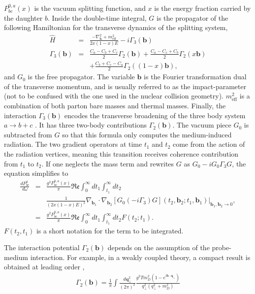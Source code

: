 $P^{0,a}_{bc}(x)$ is the vacuum splitting function, and $x$ is the energy fraction carried by the daughter $b$.
Inside the double-time integral, $G$ is the propagator of the following Hamiltonian for the transverse dynamics of the splitting system,
\begin{eqnarray}
\hat{H} &=& \frac{-\nabla^2_{\mathbf{b}} + m^2_\textrm{eff}}{2x(1-x)E} - i \Gamma_3(\mathbf{b})\\
\Gamma_3(\mathbf{b}) &=& \frac{C_a-C_b+C_c}{2}\Gamma_2(\mathbf{b}) + \frac{C_a-C_c+C_b}{2}\Gamma_2(x\mathbf{b}) \\\nonumber
&&+ \frac{C_b+C_c-C_a}{2}\Gamma_2((1-x)\mathbf{b}),
\end{eqnarray}
and $G_0$ is the free propagator. 
The variable $\mathbf{b}$ is the Fourier transformation dual of the transverse momentum, and is usually referred to as the impact-parameter (not to be confused with the one used in the nuclear collision geometry).
$m^2_\textrm{eff}$ is a combination of both parton bare masses and thermal masses.
Finally, the interaction $\Gamma_3(\mathbf{b})$ encodes the transverse broadening of the three body system $a\rightarrow b+c$ \cite{Zakharov:1997uu}.
It has three two-body contributions $\Gamma_2(\mathbf{b})$.
The vacuum piece $G_0$ is subtracted from $G$ so that this formula only computes the medium-induced radiation.
The two gradient operators at time $t_1$ and $t_2$ come from the action of the radiation vertices, meaning this transition receives coherence contribution from $t_1$ to $t_2$.
If one neglects the mass term and rewrites $G$ as $G_0 -i G_0\Gamma_3 G$, the equation simplifies to 
\begin{eqnarray}
\nonumber
\frac{dP^{a}_{bc}}{d\omega} &=& \frac{g^2 P^{0,a}_{bc}(x)}{\pi}\mathfrak{Re}\int_0^\infty dt_1 \int_{t_1}^{\infty} dt_2\\ &&\frac{1}{(2x(1-x) E)^2}\nabla_{\mathbf{b}_1} \cdot\nabla_{\mathbf{b}_2} [G_0(-i\Gamma_3) G](t_2, \mathbf{b}_2;t_1, \mathbf{b}_1)|_{\mathbf{b}_1, \mathbf{b}_2 \rightarrow 0},\\
&=& \frac{g^2 P^{0,a}_{bc}(x)}{\pi}\mathfrak{Re}\int_0^\infty dt_1 \int_{t_1}^{\infty} dt_2 F(t_2; t_1).
\label{eq:theory-dR-2}
\end{eqnarray}
$F(t_2, t_1)$ is a short notation for the term to be integrated.

The interaction potential $\Gamma_2(\mathbf{b})$ depends on the assumption of the probe-medium interaction.
For example, in a weakly coupled theory, a compact result is obtained at leading order \cite{Aurenche:2002pd},
\begin{eqnarray}
\Gamma_2(\mathbf{b}) = \frac{1}{\pi}\int \frac{d\mathbf{q}_\perp^2}{(2\pi)^2} \frac{g^2 T m_D^2 (1-e^{i\mathbf{b}\cdot\mathbf{q_\perp}})}{q_\perp^2(q_\perp^2+m_D^2)}
\end{eqnarray}

